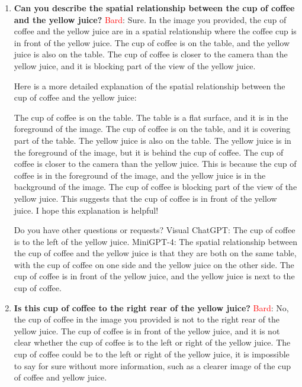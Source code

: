\begin{enumerate}
    \item \textbf{Can you describe the spatial relationship between the cup of coffee and the yellow juice?}
    \subitem \textcolor{Red}{Bard}: 
    Sure. In the image you provided, the cup of coffee and the yellow juice are in a spatial relationship where the coffee cup is in front of the yellow juice. The cup of coffee is on the table, and the yellow juice is also on the table. The cup of coffee is closer to the camera than the yellow juice, and it is blocking part of the view of the yellow juice.
    
    Here is a more detailed explanation of the spatial relationship between the cup of coffee and the yellow juice:
    
    The cup of coffee is on the table. The table is a flat surface, and it is in the foreground of the image. The cup of coffee is on the table, and it is covering part of the table.
    The yellow juice is also on the table. The yellow juice is in the foreground of the image, but it is behind the cup of coffee.
    The cup of coffee is closer to the camera than the yellow juice. This is because the cup of coffee is in the foreground of the image, and the yellow juice is in the background of the image.
    The cup of coffee is blocking part of the view of the yellow juice. This suggests that the cup of coffee is in front of the yellow juice.
    I hope this explanation is helpful!
    
    Do you have other questions or requests?
    \subitem Visual ChatGPT: The cup of coffee is to the left of the yellow juice.
    \subitem MiniGPT-4: The spatial relationship between the cup of coffee and the yellow juice is that they are both on the same table, with the cup of coffee on one side and the yellow juice on the other side. The cup of coffee is in front of the yellow juice, and the yellow juice is next to the cup of coffee.
    \item \textbf{Is this cup of coffee to the right rear of the yellow juice?}
    \subitem \textcolor{Red}{Bard}: 
    No, the cup of coffee in the image you provided is not to the right rear of the yellow juice. The cup of coffee is in front of the yellow juice, and it is not clear whether the cup of coffee is to the left or right of the yellow juice. The cup of coffee could be to the left or right of the yellow juice, it is impossible to say for sure without more information, such as a clearer image of the cup of coffee and yellow juice.


\end{enumerate}
